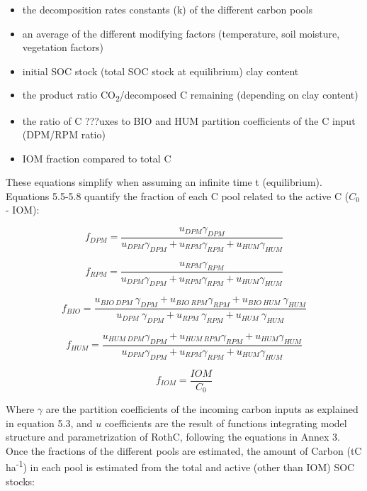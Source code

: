\documentclass[
  10pt,
  b5paper,
]{book}
\providecommand{\tightlist}{%
  \setlength{\itemsep}{0pt}\setlength{\parskip}{0pt}}
\begin{document}
\begin{itemize}
\tightlist
\item
  the decomposition rates constants (k) of the different carbon pools
\item
  an average of the different modifying factors (temperature, soil moisture, vegetation factors)
\item
  initial SOC stock (total SOC stock at equilibrium)
  clay content
\item
  the product ratio CO\textsubscript{2}/decomposed C remaining (depending on clay content)
\item
  the ratio of C ???uxes to BIO and HUM
  partition coefficients of the C input (DPM/RPM ratio)
\item
  IOM fraction compared to total C
\end{itemize}

These equations simplify when assuming an infinite time t (equilibrium). Equations 5.5-5.8 quantify the fraction of each C pool related to the active C (\(C_0\) - IOM):

\begin{equation}
\tag{5.5}
f_{DPM}= \frac{u_{DPM}\gamma_{DPM}}{u_{DPM}\gamma_{DPM}+u_{RPM}\gamma_{RPM}+ u_{HUM}\gamma_{HUM}}
\end{equation}

\begin{equation}
\tag{5.6}
f_{RPM}= \frac{u_{RPM}\gamma_{RPM}}{u_{DPM}\gamma_{DPM}+u_{RPM}\gamma_{RPM}+ u_{HUM}\gamma_{HUM}}
\end{equation}

\begin{equation}
\tag{5.7}
f_{BIO}= \frac{u_{BIO\ DPM}\ \gamma_{DPM}+u_{BIO\ RPM}\gamma_{RPM}+ u_{BIO\ HUM}\ \gamma_{HUM}}{u_{DPM}\ \gamma_{DPM}+u_{RPM}\ \gamma_{RPM}+u_{HUM}\ \gamma_{HUM}}
\end{equation}

\begin{equation}
\tag{5.8}
f_{HUM}=\frac{u_{HUM\ DPM}\gamma_{DPM} + u_{HUM \ RPM} \gamma_{RPM}+ u_{HUM}\gamma_{HUM}}{u_{DPM}\gamma_{DPM}+u_{RPM}\gamma_{RPM}+u_{HUM}\gamma_{HUM}}
\end{equation}

\begin{equation}
\tag{5.9}
f_{IOM}= \frac{IOM}{C_0}
\end{equation}

Where \(\gamma\) are the partition coefficients of the incoming carbon inputs as explained in equation 5.3, and \(u\) coefficients are the result of functions integrating model structure and parametrization of RothC, following the equations in Annex 3.
Once the fractions of the different pools are estimated, the amount of Carbon (tC ha\textsuperscript{-1}) in each pool is estimated from the total and active (other than IOM) SOC stocks:
\end{document}
